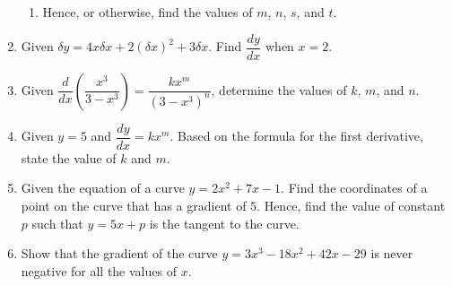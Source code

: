 \documentclass{report}
\begin{document}
\begin{multicols}{2}
\begin{enumerate}
\begin{enumerate}
                        \item Hence, or otherwise, find the values of $m$, $n$, $s$, and $t$.
                  \end{enumerate}
            \item Given $\delta y = 4x \delta x + 2{(\delta x)}^2 + 3 \delta x$. Find
                  $\dfrac{dy}{dx}$ when $x = 2$.
            \item Given $\dfrac{d}{dx}\left(\dfrac{x^3}{3-x^3}\right) =
                        \dfrac{kx^m}{{(3-x^3)}^n}$, determine the values of $k$, $m$, and $n$.
            \item Given $y = 5$ and $\dfrac{dy}{dx} = kx^m$. Based on the formula for the first
                  derivative, state the value of $k$ and $m$.
            \item Given the equation of a curve $y = 2x^2 + 7x -1$. Find the coordinates of a
                  point on the curve that has a gradient of $5$. Hence, find the value of
                  constant $p$ such that $y = 5x + p$ is the tangent to the curve.
            \item Show that the gradient of the curve $y = 3x^3 - 18x^2 + 42x - 29$ is never
                  negative for all the values of $x$.
      \end{enumerate}

\end{multicols}
\end{document}
